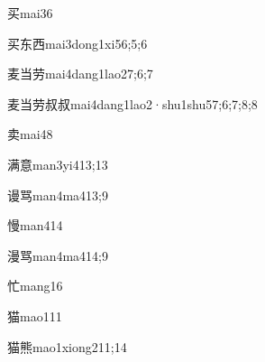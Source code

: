 \begin{verbete}{买}{mai3}{6}
\end{verbete}

\begin{verbete}{买东西}{mai3dong1xi5}{6;5;6}
\end{verbete}

\begin{verbete}{麦当劳}{mai4dang1lao2}{7;6;7}
\end{verbete}

\begin{verbete}{麦当劳叔叔}{mai4dang1lao2·shu1shu5}{7;6;7;8;8}
\end{verbete}

\begin{verbete}{卖}{mai4}{8}
\end{verbete}

\begin{verbete}{满意}{man3yi4}{13;13}
\end{verbete}

\begin{verbete}{谩骂}{man4ma4}{13;9}
\end{verbete}

\begin{verbete}{慢}{man4}{14}
\end{verbete}

\begin{verbete}{漫骂}{man4ma4}{14;9}
\end{verbete}

\begin{verbete}{忙}{mang1}{6}
\end{verbete}

\begin{verbete}{猫}{mao1}{11}
\end{verbete}

\begin{verbete}{猫熊}{mao1xiong2}{11;14}
\end{verbete}

